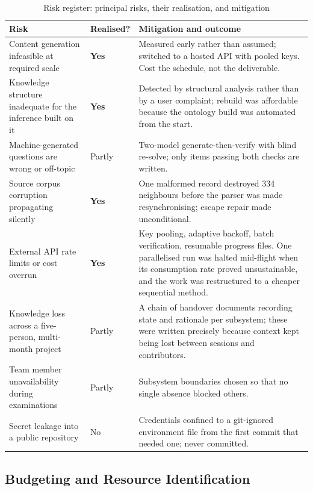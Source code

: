 \begin{table}[htbp]
  \centering
  \caption{Risk register: principal risks, their realisation, and mitigation}
  \label{tab:risks}
  \begin{tabularx}{\textwidth}{>{\hsize}Y>{\hsize}Y>{\hsize}Y}
    \toprule
    Risk & Realised? & Mitigation and outcome \\
    \midrule
    Content generation infeasible at required scale & \textbf{Yes} & Measured early rather than assumed; switched to a hosted API with pooled keys. Cost the schedule, not the deliverable. \\
    Knowledge structure inadequate for the inference built on it & \textbf{Yes} & Detected by structural analysis rather than by a user complaint; rebuild was affordable because the ontology build was automated from the start. \\
    Machine-generated questions are wrong or off-topic & Partly & Two-model generate-then-verify with blind re-solve; only items passing both checks are written. \\
    Source corpus corruption propagating silently & \textbf{Yes} & One malformed record destroyed 334 neighbours before the parser was made resynchronising; escape repair made unconditional. \\
    External API rate limits or cost overrun & \textbf{Yes} & Key pooling, adaptive backoff, batch verification, resumable progress files. One parallelised run was halted mid-flight when its consumption rate proved unsustainable, and the work was restructured to a cheaper sequential method. \\
    Knowledge loss across a five-person, multi-month project & Partly & A chain of handover documents recording state and rationale per subsystem; these were written precisely because context kept being lost between sessions and contributors. \\
    Team member unavailability during examinations & Partly & Subsystem boundaries chosen so that no single absence blocked others. \\
    Secret leakage into a public repository & No & Credentials confined to a git-ignored environment file from the first commit that needed one; never committed. \\
    \bottomrule
  \end{tabularx}
\end{table}

\subsection{Budgeting and Resource Identification}
\label{sec:budget}

